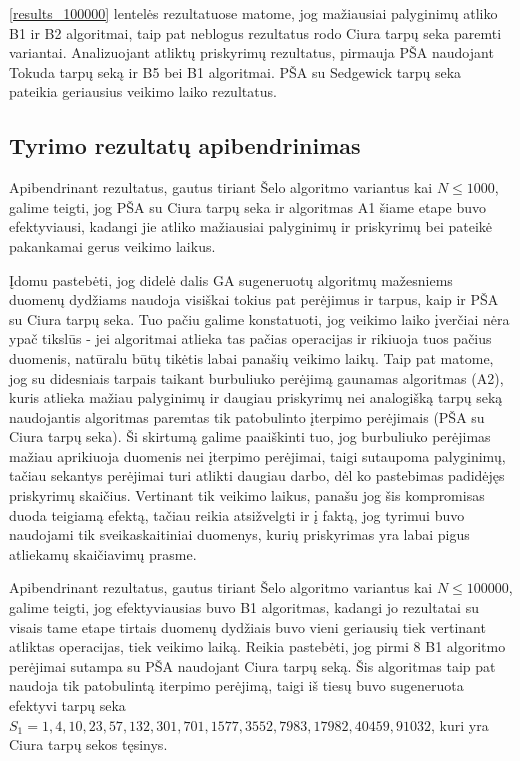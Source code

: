 \documentclass{VUMIFInfKursinis}
\begin{document}
\ref{results_100000} lentelės rezultatuose matome, jog
mažiausiai palyginimų atliko B1 ir B2 algoritmai, taip pat neblogus rezultatus rodo Ciura tarpų seka paremti variantai.
Analizuojant atliktų priskyrimų rezultatus, pirmauja PŠA naudojant Tokuda tarpų seką ir B5 bei B1 algoritmai.
PŠA su Sedgewick tarpų seka pateikia geriausius veikimo laiko rezultatus.

\subsection{Tyrimo rezultatų apibendrinimas}

Apibendrinant rezultatus, gautus tiriant Šelo algoritmo variantus kai $N \leq 1000$,
galime teigti, jog PŠA su Ciura tarpų seka ir algoritmas A1 šiame etape buvo efektyviausi,
kadangi jie atliko mažiausiai palyginimų ir priskyrimų bei pateikė pakankamai gerus veikimo laikus.

Įdomu pastebėti, jog didelė dalis GA sugeneruotų algoritmų mažesniems duomenų dydžiams naudoja visiškai tokius pat perėjimus ir tarpus,
kaip ir PŠA su Ciura tarpų seka. Tuo pačiu galime konstatuoti, jog veikimo laiko įverčiai nėra ypač tikslūs -
jei algoritmai atlieka tas pačias operacijas ir rikiuoja tuos pačius duomenis, natūralu būtų tikėtis labai panašių veikimo laikų. 
Taip pat matome, jog su didesniais tarpais taikant burbuliuko perėjimą gaunamas algoritmas (A2), kuris atlieka mažiau palyginimų ir daugiau priskyrimų
nei analogišką tarpų seką naudojantis algoritmas paremtas tik patobulinto įterpimo perėjimais (PŠA su Ciura tarpų seka).
Ši skirtumą galime paaiškinti tuo, jog burbuliuko perėjimas mažiau aprikiuoja duomenis nei įterpimo perėjimai, taigi sutaupoma palyginimų,
tačiau sekantys perėjimai turi atlikti daugiau darbo, dėl ko pastebimas padidėjęs priskyrimų skaičius.
Vertinant tik veikimo laikus, panašu jog šis kompromisas duoda teigiamą efektą, tačiau reikia atsižvelgti ir į faktą, jog tyrimui
buvo naudojami tik sveikaskaitiniai duomenys, kurių priskyrimas yra labai pigus atliekamų skaičiavimų prasme. 

Apibendrinant rezultatus, gautus tiriant Šelo algoritmo variantus kai $N \leq 100000$,
galime teigti, jog efektyviausias buvo B1 algoritmas, kadangi jo rezultatai su visais tame etape tirtais duomenų dydžiais buvo vieni geriausių tiek vertinant atliktas operacijas, tiek veikimo laiką.
Reikia pastebėti, jog pirmi 8 B1 algoritmo perėjimai sutampa su PŠA naudojant Ciura tarpų seką.
Šis algoritmas taip pat naudoja tik patobulintą iterpimo perėjimą, taigi iš tiesų buvo sugeneruota efektyvi tarpų seka ${S_1 = 1, 4, 10, 23, 57, 132, 301, 701, 1577, 3552, 7983, 17982, 40459, 91032}$,
kuri yra Ciura tarpų sekos tęsinys.
\end{document}
